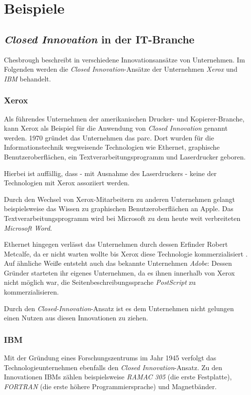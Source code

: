 \section{Beispiele}\label{sec:beispiele}

\subsection{\textit{Closed Innovation} in der IT-Branche}\label{sec:beispiele-unternehmen}
Chesbrough beschreibt in \cite{chesbrough2003} verschiedene Innovationsansätze von Unternehmen.
Im Folgenden werden die \textit{Closed Innovation}-Ansätze der Unternehmen \textit{Xerox} und \textit{IBM} behandelt.

\subsubsection{Xerox \cite[1\psqq]{chesbrough2003}}
Als führendes Unternehmen der amerikanischen Drucker- und Kopierer-\linebreak{}Branche,
kann Xerox als Beispiel für die Anwendung von \textit{Closed Innovation} genannt werden.
1970 gründet das Unternehmen das \ac{parc}.
Dort wurden für die Informationstechnik wegweisende Technologien wie
Ethernet, graphische Benutzeroberflächen, ein Textverarbeitungsprogramm und Laserdrucker geboren.

Hierbei ist auffällig, dass - mit Ausnahme des Laserdruckers - keine der Technologien mit Xerox
assoziiert werden.

Durch den Wechsel von Xerox-Mitarbeitern zu anderen Unternehmen
gelangt beispielsweise das Wissen zu graphischen Benutzeroberflächen an Apple.
Das Textverarbeitungsprogramm wird bei Microsoft zu dem heute weit verbreiteten \textit{Microsoft Word}.

Ethernet hingegen verlässt das Unternehmen durch dessen Erfinder Robert Metcalfe,
da er nicht warten wollte bis Xerox diese Technologie kommerzialisiert \cite[81]{chesbrough2003}.
Auf ähnliche Weiße entsteht auch das bekannte Unternehmen \textit{Adobe}:
Dessen Gründer starteten ihr eigenes Unternehmen,
da es ihnen innerhalb von Xerox nicht möglich war,
die Seitenbeschreibungssprache \textit{PostScript} zu kommerzialisieren.

Durch den \textit{Closed-Innovation}-Ansatz ist es dem Unternehmen nicht gelungen einen Nutzen aus diesen Innovationen zu ziehen.

\newpage
\subsubsection{IBM \cite[93\psqq]{chesbrough2003}}
Mit der Gründung eines Forschungszentrums im Jahr 1945 verfolgt das Technologieunternehmen ebenfalls den \textit{Closed Innovation}-Ansatz.
Zu den Innovationen IBMs zählen beispielsweise
\textit{RAMAC 305} (die erste Festplatte),
\textit{FORTRAN} (die erste höhere Programmiersprache) und
Magnetbänder.

